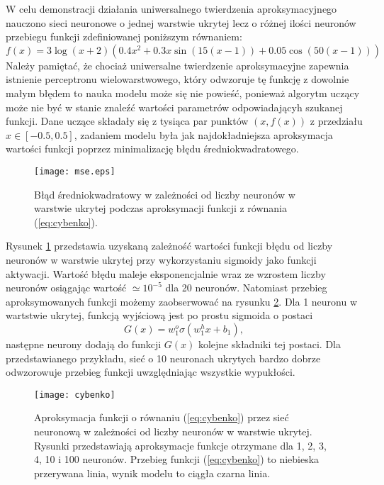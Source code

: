 \documentclass[11pt]{book}
\theoremstyle{definition}
\begin{document}
W celu demonstracji działania uniwersalnego twierdzenia aproksymacyjnego nauczono sieci neuronowe o jednej warstwie ukrytej lecz o różnej ilości neuronów przebiegu funkcji zdefiniowanej poniższym równaniem:
%
\begin{equation}
f(x) = 3\log\left(x+2\right) \left(0.4x^2+0.3x\sin(15(x-1))+0.05\cos\left(50(x-1)\right)\right) \label{eq:cybenko}
\end{equation}
%
Należy pamiętać, że chociaż uniwersalne twierdzenie aproksymacyjne zapewnia istnienie perceptronu wielowarstwowego, który odwzoruje tę funkcję z dowolnie małym błędem to nauka modelu może się nie powieść, ponieważ algorytm uczący może nie być w stanie znaleźć wartości parametrów odpowiadającyh szukanej funkcji. Dane uczące składały się z tysiąca par punktów $(x,f(x))$ z przedziału $x\in [-0.5,0.5]$, zadaniem modelu była jak najdokładniejsza aproksymacja wartości funkcji poprzez minimalizację błędu średniokwadratowego. 
%
\begin{figure}[h!]
	\centering
	\texttt{[image: mse.eps]}
	\caption{Błąd średniokwadratowy w zależności od liczby neuronów w warstwie ukrytej podczas aproksymacji funkcji z równania (\ref{eq:cybenko}).}
	\label{fig:cybenko1}
\end{figure}
Rysunek \ref{fig:cybenko1} przedstawia uzyskaną zależność wartości funkcji błędu od liczby neuronów w warstwie ukrytej przy wykorzystaniu sigmoidy jako funkcji aktywacji. Wartość błędu maleje eksponencjalnie wraz ze wzrostem liczby neuronów osiągając wartość $\simeq 10^{-5}$ dla 20 neuronów.
%
Natomiast przebieg aproksymowanych funkcji możemy zaobserwować na rysunku \ref{fig:cybenko2}. Dla 1 neuronu w wartstwie ukrytej, funkcją wyjściową jest po prostu sigmoida o postaci $$G\left(x\right) = w^o_1 \sigma\left(w^h_1x + b_1\right),$$ następne neurony dodają do funkcji $G(x)$ kolejne składniki tej postaci. Dla przedstawianego przykładu, sieć o 10 neuronach ukrytych bardzo dobrze odwzorowuje przebieg funkcji uwzględniając wszystkie wypukłości.

\begin{figure}[h!]
	\centering
	\texttt{[image: cybenko]}
	\caption{Aproksymacja funkcji o równaniu (\ref{eq:cybenko}) przez sieć neuronową w zależności od liczby neuronów w warstwie ukrytej. Rysunki przedstawiają aproksymacje funkcje otrzymane dla 1, 2, 3, 4, 10 i 100 neuronów. Przebieg funkcji (\ref{eq:cybenko}) to niebieska przerywana linia, wynik modelu to ciągła czarna linia.}
		 \label{fig:cybenko2}
\end{figure}
\end{document}
